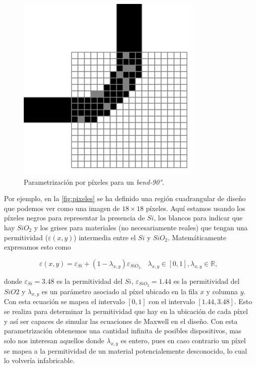 \begin{figure}[h]
  \centering
  \includegraphics[scale=0.7]{image/theory/parametrization-pixeles.png}
  \caption{Parametrización por píxeles para un \emph{bend-90°.}}
  \label{fig:pixeles}
\end{figure}

Por ejemplo, en la \autoref{fig:pixeles} se ha definido una región cuadrangular de
diseño que podemos ver como una imagen de $18 \times 18$ píxeles.
Aquí estamos usando los píxeles negros para representar la presencia de $Si$,
los blancos para indicar que hay $SiO_2$ y los grises para materiales (no
necesariamente reales) que tengan una permitividad ($\varepsilon(x, y)$) intermedia entre el $Si$
y $SiO_2$. Matemáticamente expresamos esto como

\begin{equation}
  \varepsilon(x, y) = \varepsilon_{Si} + (1 - \lambda_{x,y})
  \varepsilon_{SiO_2} \quad \lambda_{x, y} \in [0, 1], \lambda_{x, y} \in
  \mathbb{R}, 
\label{eq:permitivity}
\end{equation}

donde $\varepsilon_{Si} = 3.48$ es la permitividad del $Si$,
$\varepsilon_{SiO_2} = 1.44$ es la permitividad del $SiO2$ y $\lambda_{x, y}$
es un parámetro asociado al píxel ubicado en la fila $x$ y columna $y$.
Con esta ecuación se mapea el intervalo $[0, 1]$ con el intervalo $[1.44, 3.48]$. 
Esto se realiza para determinar la permitividad que hay en la ubicación de cada
píxel y así ser capaces de simular las ecuaciones de Maxwell en el diseño.
Con esta parametrización obtenemos una cantidad infinita de posibles dispositivos, 
mas solo nos interesan aquellos donde $\lambda_{x,y}$ es entero, 
pues en caso contrario un píxel se mapea a la permitividad de un material
potencialemente desconocido, lo cual lo volvería infabricable.

